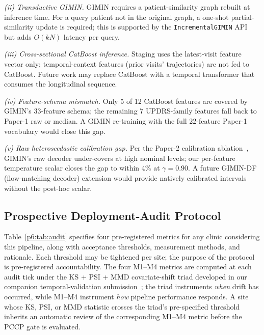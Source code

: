 \textit{(ii) Transductive GIMIN.} GIMIN requires a patient-similarity graph rebuilt at inference time. For a query patient not in the original graph, a one-shot partial-similarity update is required; this is supported by the \texttt{IncrementalGIMIN} API~\cite{dupre2026paper2} but adds $O(kN)$ latency per query.

\textit{(iii) Cross-sectional CatBoost inference.} Staging uses the latest-visit feature vector only; temporal-context features (prior visits' trajectories) are not fed to CatBoost. Future work may replace CatBoost with a temporal transformer that consumes the longitudinal sequence.

\textit{(iv) Feature-schema mismatch.} Only 5 of 12 CatBoost features are covered by GIMIN's 33-feature schema; the remaining 7 UPDRS-family features fall back to Paper-1 raw or median. A GIMIN re-training with the full 22-feature Paper-1 vocabulary would close this gap.

\textit{(v) Raw heteroscedastic calibration gap.} Per the Paper-2 calibration ablation~\cite{dupre2026paper2}, GIMIN's raw decoder under-covers at high nominal levels; our per-feature temperature scalar closes the gap to within 4\% at $\gamma = 0.90$. A future GIMIN-DF (flow-matching decoder) extension would provide natively calibrated intervals without the post-hoc scalar.

\subsection{Prospective Deployment-Audit Protocol}
\label{p6:sec:audit}

Table~\ref{p6:tab:audit} specifies four pre-registered metrics for any clinic considering this pipeline, along with acceptance thresholds, measurement methods, and rationale. Each threshold may be tightened per site; the purpose of the protocol is pre-registered accountability. The four M1--M4 metrics are computed at each audit tick under the KS + PSI + MMD covariate-shift triad developed in our companion temporal-validation submission~\cite{dupre2026paper5}; the triad instruments \textit{when} drift has occurred, while M1--M4 instrument \textit{how} pipeline performance responds. A site whose KS, PSI, or MMD statistic crosses the triad's pre-specified threshold inherits an automatic review of the corresponding M1--M4 metric before the PCCP gate is evaluated.

